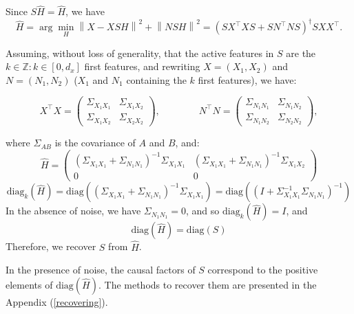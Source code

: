 \documentclass[preprint,12pt,3p]{elsarticle}
\begin{document}
Since  $S\hat H = \hat H$, we have
\begin{equation}
  \hat H = \arg \min_H  \left \| X - XSH\right\| ^2  + \left \| NSH\right \| ^2 = (S X^\top XS +SN^\top NS) ^\dagger SXX^\top.
\end{equation}

Assuming, without loss of generality, that the active features in $S$ are the $k
\in \mathbb{Z}: k \in [0, d_x]$ first features, and rewriting $X=(X_1,X_2)$ and
$N=(N_1,N_2)$ ($X_1$ and $N_1$ containing the $k$ first features), we have:

\begin{equation}
  X^\top X = \left(\begin{array}{lccl}\Sigma_{X_1 X_1} & \Sigma_{X_1 X_2} \\ \Sigma_{X_1 X_2} & \Sigma_{X_2 X_2}\end{array}\right),\qquad\qquad N^\top N = \left(\begin{array}{lccl}\Sigma_{N_1 N_1} & \Sigma_{N_1 N_2} \\ \Sigma_{N_1 N_2} & \Sigma_{N_2 N_2}\end{array}\right),
\end{equation}

where $\Sigma_{A B}$ is the covariance of $A$ and $B$, and:
\begin{equation}
  \hat H = \left(\begin{array}{cc}(\Sigma_{X_1 X_1}+\Sigma_{N_1 N_1})^{-1}\Sigma_{X_1 X_1} & (\Sigma_{X_1 X_1}+\Sigma_{N_1 N_1})^{-1}\Sigma_{X_1 X_2} \\0 & 0\end{array}\right)
\end{equation}
\begin{equation}
  \text{diag}_k (\hat H) = \text{diag}((\Sigma_{X_1 X_1}+\Sigma_{N_1 N_1})^{-1}\Sigma_{X_1 X_1}) = \text{diag}((I+\Sigma_{X_1 X_1}^{-1}\Sigma_{N_1 N_1})^{-1})
  \label{eq:diagk}
\end{equation}
%
%
In the absence of noise, we have $\Sigma_{N_1 N_1}=0$, and so
$\text{diag}_k(\hat H)=I$, and $$\text{diag}(\hat H) = \text{diag}(S)$$
Therefore, we recover $S$ from $\hat H$.


In the presence of noise, the causal factors of $S$ correspond to the positive
elements of $\text{diag}(\hat H)$. The methods to recover them are presented in
the Appendix (\ref{recovering}).
\end{document}
